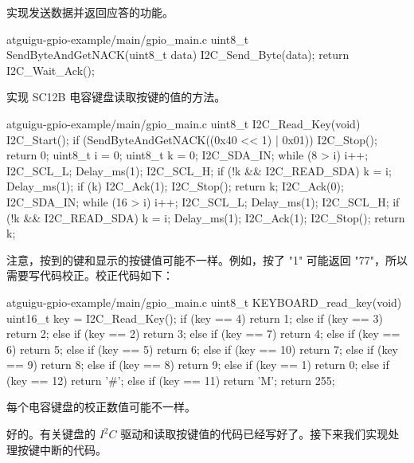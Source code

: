 \documentclass[lang=cn,newtx,10pt,scheme=chinese]{elegantbook}
\begin{document}
实现发送数据并返回应答的功能。

\begin{mycode}{atguigu-gpio-example/main/gpio\_main.c}
uint8_t SendByteAndGetNACK(uint8_t data)
{
    I2C_Send_Byte(data);
    return I2C_Wait_Ack();
}
\end{mycode}

实现 SC12B 电容键盘读取按键的值的方法。

\begin{mycode}{atguigu-gpio-example/main/gpio\_main.c}
uint8_t I2C_Read_Key(void)
{
    I2C_Start();
    if (SendByteAndGetNACK((0x40 << 1) | 0x01))
    {
        I2C_Stop();
        return 0;
    }
    uint8_t i = 0;
    uint8_t k = 0;
    I2C_SDA_IN;
    while (8 > i)
    {
        i++;
        I2C_SCL_L;
        Delay_ms(1);
        I2C_SCL_H;
        if (!k && I2C_READ_SDA)
        {
            k = i;
        }
        Delay_ms(1);
    }
    if (k)
    {
        I2C_Ack(1);
        I2C_Stop();
        return k;
    }
    I2C_Ack(0);
    I2C_SDA_IN;
    while (16 > i)
    {
        i++;
        I2C_SCL_L;
        Delay_ms(1);
        I2C_SCL_H;
        if (!k && I2C_READ_SDA)
        {
            k = i;
        }
        Delay_ms(1);
    }
    I2C_Ack(1);
    I2C_Stop();
    return k;
}
\end{mycode}

注意，按到的键和显示的按键值可能不一样。例如，按了 "1" 可能返回 "77"，所以需要写代码校正。校正代码如下：

\begin{mycode}{atguigu-gpio-example/main/gpio\_main.c}
uint8_t KEYBOARD_read_key(void)
{
    uint16_t key = I2C_Read_Key();
    if (key == 4)
        return 1;
    else if (key == 3)
        return 2;
    else if (key == 2)
        return 3;
    else if (key == 7)
        return 4;
    else if (key == 6)
        return 5;
    else if (key == 5)
        return 6;
    else if (key == 10)
        return 7;
    else if (key == 9)
        return 8;
    else if (key == 8)
        return 9;
    else if (key == 1)
        return 0;
    else if (key == 12)
        return '#';
    else if (key == 11)
        return 'M';
    return 255;
}
\end{mycode}

\begin{marker}
每个电容键盘的校正数值可能不一样。
\end{marker}

好的。有关键盘的 $I^2C$ 驱动和读取按键值的代码已经写好了。接下来我们实现处理按键中断的代码。
\end{document}
